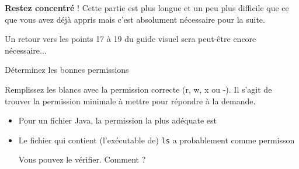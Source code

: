 \documentclass[a4paper,11pt]{article}
\begin{document}
\textbf{Restez concentr\'e} ! 
Cette partie est plus longue et un peu plus difficile que ce que vous avez d\'ej\`a appris 
mais c'est absolument n\'ecessaire pour la suite.   

Un retour vers les points 17 \`a 19 du guide visuel sera peut-\^etre encore n\'ecessaire...  


\begin{Exercice}{Déterminez les bonnes permissions}
	
	Remplissez les blancs avec la permission correcte (r, w, x ou -).  Il s'agit
	de trouver la permission minimale \`a mettre pour r\'epondre \`a la demande.   
	
	\begin{itemize}
		
		\item Pour un fichier Java, la permission la plus ad\'equate est
			\textcolor{gray}{\underline{\hspace*{1em}}}
			\textcolor{gray}{\underline{\hspace*{1em}}}
			\textcolor{gray}{\underline{\hspace*{1em}}} 
	
		\item Le fichier qui contient (l'ex\'ecutable de) \texttt{ls}
			a probablement comme permisson\\
		\textcolor{gray}{\underline{\hspace*{1em}}}
		\textcolor{gray}{\underline{\hspace*{1em}}}
		\textcolor{gray}{\underline{\hspace*{1em}}}

		    Vous pouvez le vérifier. Comment ? 
	
\end{itemize}
	
\end{Exercice}
\end{document}
